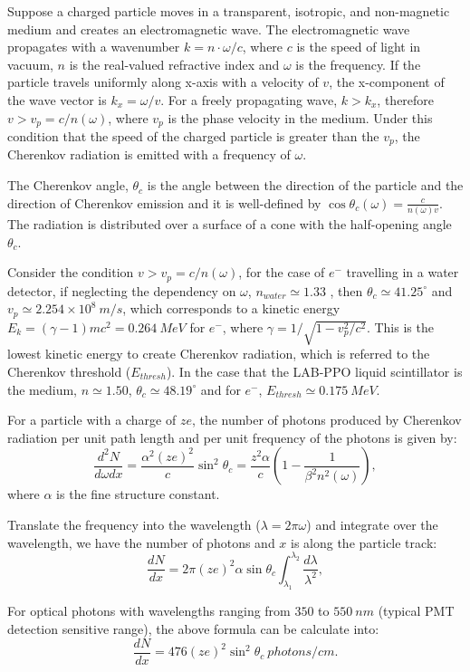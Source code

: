 Suppose a charged particle moves in a transparent, isotropic, and non-magnetic medium and creates an electromagnetic wave. The electromagnetic wave propagates with a wavenumber $k=n\cdot\omega/c$, where $c$ is the speed of light in vacuum, $n$ is the real-valued refractive index and $\omega$ is the frequency. If the particle travels uniformly along x-axis with a velocity of $v$, the x-component of the wave vector is $k_x=\omega/v$. For a freely propagating wave, $k>k_x$, therefore $v>v_p=c/n(\omega)$, where $v_p$ is the phase velocity in the medium. Under this condition that the speed of the charged particle is greater than the $v_p$, the Cherenkov radiation is emitted with a frequency of $\omega$\cite{landau2013electrodynamics}.   

The Cherenkov angle, $\theta_c$ is the angle between the direction of the particle and the direction of Cherenkov emission and it is well-defined by $\cos\theta_c(\omega) = \frac{c}{n(\omega)v}$. The radiation is distributed over a surface of a cone with the half-opening angle $\theta_c$. 

Consider the condition $v>v_p=c/n(\omega)$, for the case of $e^-$ travelling in a water detector, if neglecting the dependency on $\omega$, $n_{water}\simeq 1.33$ \cite{pdg2018}, then $\theta_c\simeq 41.25^\circ$ and $v_p\simeq 2.254\times10^8~m/s$, which corresponds to a kinetic energy $E_k=(\gamma-1)mc^2=0.264~MeV$ for $e^-$, where $\gamma=1/\sqrt{1-v_p^2/c^2}$. This is the lowest kinetic energy to create Cherenkov radiation, which is referred to the Cherenkov threshold ($E_{thresh}$). In the case that the LAB-PPO liquid scintillator is the medium, $n\simeq 1.50$\cite{tseung2011ellipsometric}, $\theta_c\simeq 48.19^\circ$ and for $e^-$, $E_{thresh}\simeq 0.175~MeV$.   

For a particle with a charge of $ze$, the number of photons produced by Cherenkov radiation per unit path length and per unit frequency of the photons is given by\cite{leo2012techniques}:
\[
\frac{d^2N}{d\omega dx}=\frac{\alpha^2 (ze)^2}{c}\sin^2\theta_c=\frac{z^2\alpha}{c}(1-\frac{1}{\beta^2 n^2(\omega)}),
\]
where $\alpha$ is the fine structure constant.

Translate the frequency into the wavelength ($\lambda=2\pi\omega$) and integrate over the wavelength, we have the number of photons and $x$ is along the particle track\cite{leo2012techniques}:
\[
\frac{dN}{dx}=2\pi (ze)^2\alpha\sin\theta_c\int_{\lambda_1}^{\lambda_2}\frac{d\lambda}{\lambda^2},
\]

For optical photons with wavelengths ranging from $350$ to $550~nm$ (typical PMT detection sensitive range), the above formula can be calculate into\cite{leo2012techniques}:
\[
\frac{dN}{dx}=476(ze)^2\sin^2\theta_c~photons/cm.
\]


